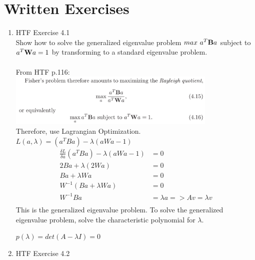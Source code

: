 \documentclass{report}
\begin{document}
\section*{Written Exercises}	
\begin{enumerate}
\item HTF Exercise 4.1 \\
Show how to solve the generalized eigenvalue problem $max \ a^T \bold{B}a$
subject to $a^T\bold{W}a = 1$ by transforming to a standard eigenvalue problem. \\ \\
From HTF p.116:\\
\includegraphics[width=10cm]{images/hint.png} \\
Therefore, use Lagrangian Optimization.
$L(a, \lambda)= (a^TBa)-\lambda(aWa-1)$ \\
\begin{align*}
\frac{\delta L}{\delta a} (a^TBa)-\lambda(aWa-1) &= 0 \\
2Ba+\lambda(2Wa) &= 0 \\
Ba + \lambda W a &= 0\\
W^{-1}(Ba+\lambda W a) &= 0\\
W^{-1}Ba &= \lambda a => Av = \lambda v\\
\end{align*}
This is the generalized eigenvalue problem. To solve the generalized eigenvalue problem, solve the characteristic polynomial for $\lambda$. \\
\begin{center}
$p(\lambda) = det(A-\lambda I)=0$ \\
\end{center}
\item HTF Exercise 4.2
\end{enumerate}
\end{document}
